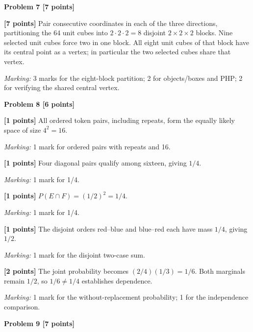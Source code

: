 \documentclass[12pt,letterpaper]{article}
\newcommand{\problemheading}[2][5\baselineskip]{\Needspace{#1}\par\noindent\hspace*{-0.625in}\textbf{#2}\par\nobreak\vspace{0.3em}}
\begin{document}
\vspace{0.65em}
\problemheading[\dimexpr 3\baselineskip+4\baselineskip\relax]{Problem 7 [7 points]}
\begin{description}[font=\normalfont,leftmargin=1.2em,labelsep=0.4em]
\item[] \textbf{[7 points]} Pair consecutive coordinates in each of the three directions, partitioning the 64 unit cubes into $2\cdot2\cdot2=8$ disjoint $2\times2\times2$ blocks. Nine selected unit cubes force two in one block. All eight unit cubes of that block have its central point as a vertex; in particular the two selected cubes share that vertex.
\par\textit{Marking:} 3 marks for the eight-block partition; 2 for objects/boxes and PHP; 2 for verifying the shared central vertex.
\end{description}
\vspace{0.65em}
\problemheading[\dimexpr 3\baselineskip+4\baselineskip\relax]{Problem 8 [6 points]}
\begin{description}[font=\normalfont,leftmargin=1.2em,labelsep=0.4em]
\item[(a)] \textbf{[1 points]} All ordered token pairs, including repeats, form the equally likely space of size $4^2=16$.
\par\textit{Marking:} 1 mark for ordered pairs with repeats and 16.
\item[(b)] \textbf{[1 points]} Four diagonal pairs qualify among sixteen, giving $1/4$.
\par\textit{Marking:} 1 mark for 1/4.
\item[(c)] \textbf{[1 points]} $P(E\cap F)=(1/2)^2=1/4$.
\par\textit{Marking:} 1 mark for 1/4.
\item[(d)] \textbf{[1 points]} The disjoint orders red--blue and blue--red each have mass $1/4$, giving $1/2$.
\par\textit{Marking:} 1 mark for the disjoint two-case sum.
\item[(e)] \textbf{[2 points]} The joint probability becomes $(2/4)(1/3)=1/6$. Both marginals remain $1/2$, so $1/6\ne1/4$ establishes dependence.
\par\textit{Marking:} 1 mark for the without-replacement probability; 1 for the independence comparison.
\end{description}
\vspace{0.65em}
\problemheading[\dimexpr 3\baselineskip+4\baselineskip\relax]{Problem 9 [7 points]}
\end{document}
